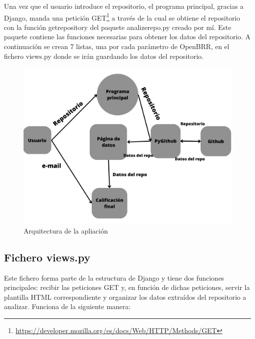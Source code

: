 \documentclass[a4paper, 12pt]{book}
\begin{document}
Una vez que el usuario introduce el repositorio, el programa principal, gracias a Django, manda una petición GET\footnote{\url{https://developer.mozilla.org/es/docs/Web/HTTP/Methods/GET}}  a través de la cual se obtiene el repositorio con la función get\textunderscore repository del paquete analize\textunderscore repo.py creado por mí. Este paquete contiene las funciones necesarias para obtener los datos del repositorio. A continuación se crean 7 listas, una por cada parámetro de OpenBRR, en el fichero views.py donde se irán guardando los datos del repositorio.

\begin{figure}
    \centering
    \includegraphics[bb=0 0 800 600, width=12cm, keepaspectratio]{img/programaprincipal.jpg}
    \caption{Arquitectura de la apliación}\label{fig:arquitectura principal}
\end{figure}

\subsection{Fichero views.py}
\label{sec:views.py}

Este fichero forma parte de la estructura de Django y tiene dos funciones principales: recibir las peticiones GET y, en función de dichas peticiones, servir la plantilla HTML correspondiente y organizar los datos extraídos del repositorio a analizar. Funciona de la siguiente manera:
\end{document}
